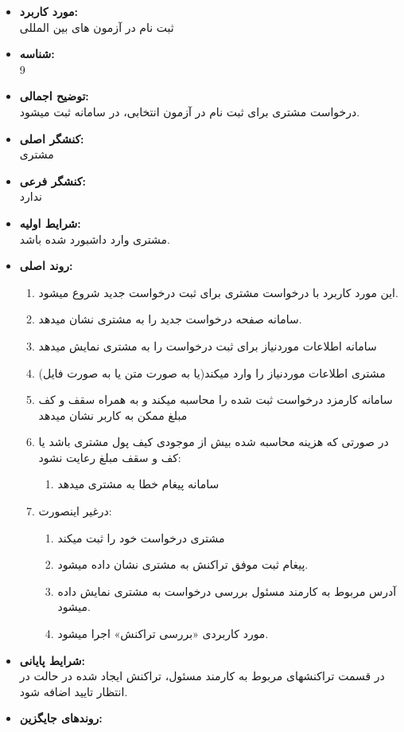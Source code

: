 \documentclass{article}
\begin{document}
\noindent\makebox[\linewidth]{\rule{\paperwidth}{0.4pt}}

\begin{itemize}
\item \textbf{مورد کاربرد:}\\
ثبت نام در آزمون های بین المللی
\item \textbf{شناسه:}\\
9
\item \textbf{توضیح اجمالی:}\\
درخواست مشتری برای ثبت نام در آزمون انتخابی، در سامانه ثبت میشود.
\item \textbf{کنشگر اصلی:}\\
مشتری
\item \textbf{کنشگر فرعی:}\\
ندارد
\item \textbf{شرایط اولیه:}\\
مشتری وارد داشبورد شده باشد.
\item \textbf{روند اصلی:}\\
\begin{enumerate}
\item  این مورد کاربرد با درخواست مشتری برای ثبت درخواست جدید شروع میشود.
\item سامانه صفحه درخواست جدید را به مشتری نشان میدهد.
\item سامانه اطلاعات موردنیاز برای ثبت درخواست را به مشتری نمایش میدهد
\item مشتری اطلاعات موردنیاز را وارد میکند(یا به صورت متن یا به صورت فایل)
\item سامانه کارمزد درخواست ثبت شده را محاسبه میکند و به همراه سقف و کف مبلغ ممکن به کاربر نشان میدهد
\item در صورتی که هزینه محاسبه شده بیش از موجودی کیف پول مشتری باشد یا کف و سقف مبلغ رعایت نشود:
\begin{enumerate}
\item سامانه پیغام خطا به مشتری میدهد
\end{enumerate}
\item درغیر اینصورت:
\begin{enumerate}
\item مشتری درخواست خود را ثبت میکند
\item پیغام ثبت موفق تراکنش به مشتری نشان داده میشود.
\item آدرس مربوط به کارمند مسئول بررسی درخواست به مشتری نمایش داده میشود.
\item مورد کاربردی «بررسی تراکنش» اجرا میشود.
\end{enumerate}

\end{enumerate}
\item \textbf{شرایط پایانی:}\\ 
در قسمت تراکنشهای مربوط به کارمند مسئول، تراکنش ایجاد شده در حالت در انتظار تایید اضافه شود.
\item \textbf{روندهای جایگزین:}\\

\end{itemize}
\end{document}
